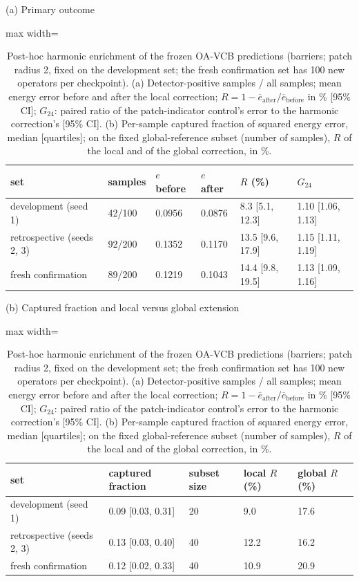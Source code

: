 \begin{table}[tbp]\centering\footnotesize\setlength{\tabcolsep}{4pt}
\caption{Post-hoc harmonic enrichment of the frozen OA-VCB predictions (barriers; patch radius 2, fixed on the development set; the fresh confirmation set has 100 new operators per checkpoint). (a) Detector-positive samples / all samples; mean energy error before and after the local correction; $R = 1-\overline{e}_{\mathrm{after}}/\overline{e}_{\mathrm{before}}$ in \% [95\% CI]; $G_{24}$: paired ratio of the patch-indicator control's error to the harmonic correction's [95\% CI]. (b) Per-sample captured fraction of squared energy error, median [quartiles]; on the fixed global-reference subset (number of samples), $R$ of the local and of the global correction, in \%.}\label{tab:harmonic}
{\small (a) Primary outcome}\par\smallskip
\begin{adjustbox}{max width=\linewidth}
\begin{tabular}{llllll}\toprule
set & samples & $e$ before & $e$ after & $R$ (\%) & $G_{24}$ \\\midrule
development (seed 1) & 42/100 & 0.0956 & 0.0876 & 8.3 [5.1, 12.3] & 1.10 [1.06, 1.13] \\
retrospective (seeds 2, 3) & 92/200 & 0.1352 & 0.1170 & 13.5 [9.6, 17.9] & 1.15 [1.11, 1.19] \\
fresh confirmation & 89/200 & 0.1219 & 0.1043 & 14.4 [9.8, 19.5] & 1.13 [1.09, 1.16] \\
\bottomrule\end{tabular}
\end{adjustbox}
\par\medskip
{\small (b) Captured fraction and local versus global extension}\par\smallskip
\begin{adjustbox}{max width=\linewidth}
\begin{tabular}{lllll}\toprule
set & captured fraction & subset size & local $R$ (\%) & global $R$ (\%) \\\midrule
development (seed 1) & 0.09 [0.03, 0.31] & 20 & 9.0 & 17.6 \\
retrospective (seeds 2, 3) & 0.13 [0.03, 0.40] & 40 & 12.2 & 16.2 \\
fresh confirmation & 0.12 [0.02, 0.33] & 40 & 10.9 & 20.9 \\
\bottomrule\end{tabular}
\end{adjustbox}
\end{table}
